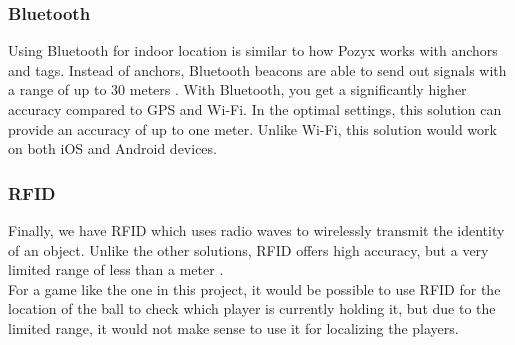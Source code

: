 \subsubsection{Bluetooth}
Using Bluetooth for indoor location is similar to how Pozyx works with anchors and tags.
Instead of anchors, Bluetooth beacons are able to send out signals with a range of up to 30 meters \cite{infsoft:bluetooth}.
With Bluetooth, you get a significantly higher accuracy compared to GPS and Wi-Fi.
In the optimal settings, this solution can provide an accuracy of up to one meter.
Unlike Wi-Fi, this solution would work on both iOS and Android devices.

\subsubsection{RFID}
Finally, we have RFID which uses radio waves to wirelessly transmit the identity of an object.
Unlike the other solutions, RFID offers high accuracy, but a very limited range of less than a meter \cite{infsoft:rfid}.\\
For a game like the one in this project, it would be possible to use RFID for the location of the ball to check which player is currently holding it, but due to the limited range, it would not make sense to use it for localizing the players.\\
